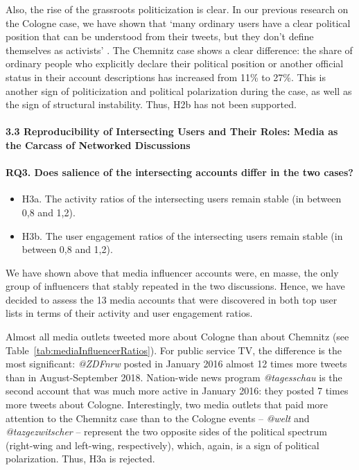 Also, the rise of the grassroots politicization is clear. In our previous research on the Cologne case, we have shown that ‘many ordinary users have a clear political position that can be understood from their tweets, but they don’t define themselves as activists’ \cite[p.~141]{SmoliarovaBodrunovaBlekanov}. The Chemnitz case shows a clear difference: the share of ordinary people who explicitly declare their political position or another official status in their account descriptions has increased from 11\% to 27\%. This is another sign of politicization and political polarization during the case, as well as the sign of structural instability. Thus, H2b has not been supported.

\paragraph{3.3 Reproducibility of Intersecting Users and Their Roles: Media as the Carcass of Networked Discussions}

\paragraph{RQ3. Does salience of the intersecting accounts differ in the two cases?}

\begin{itemize}
	\item H3a. The activity ratios of the intersecting users remain stable (in between 0,8 and 1,2).
	\item H3b. The user engagement ratios of the intersecting users remain stable (in between 0,8 and 1,2).
\end{itemize}

We have shown above that media influencer accounts were, en masse, the only group of influencers that stably repeated in the two discussions. Hence, we have decided to assess the 13 media accounts that were discovered in both top user lists in terms of their activity and user engagement ratios.

Almost all media outlets tweeted more about Cologne than about Chemnitz (see Table~\cref{tab:mediaInfluencerRatios}). For public service TV, the difference is the most significant: \textit{@ZDFnrw} posted in January 2016 almost 12 times more tweets than in August-September 2018. Nation-wide news program \textit{@tagesschau} is the second account that was much more active in January 2016: they posted 7 times more tweets about Cologne. Interestingly, two media outlets that paid more attention to the Chemnitz case than to the Cologne events -- \textit{@welt} and \textit{@tazgezwitscher} -- represent the two opposite sides of the political spectrum (right-wing and left-wing, respectively), which, again, is a sign of political polarization. Thus, H3a is rejected.

